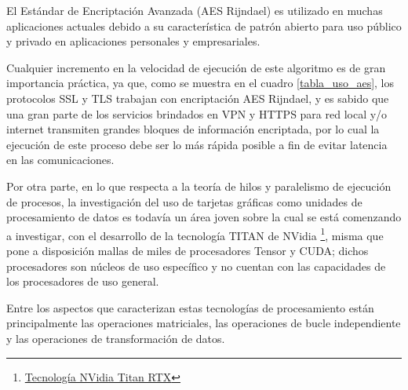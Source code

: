 \documentclass[../main/main.tex]{subfiles}
\begin{document}
  El Estándar de Encriptación Avanzada (AES Rijndael) es utilizado en muchas aplicaciones actuales debido a su característica de patrón abierto para uso público y privado en aplicaciones personales y empresariales.

  Cualquier incremento en la velocidad de ejecución de este algoritmo es de gran importancia práctica, ya que, como se muestra en el cuadro \ref{tabla_uso_aes}, los protocolos SSL y TLS trabajan con encriptación AES Rijndael, y es sabido que una gran parte de los servicios brindados en VPN y HTTPS para red local y/o internet transmiten grandes bloques de información encriptada, por lo cual la ejecución de este proceso debe ser lo más rápida posible a fin de evitar latencia en las comunicaciones.

  Por otra parte, en lo que respecta a la teoría de hilos y paralelismo de ejecución de procesos, la investigación del uso de tarjetas gráficas como unidades de procesamiento de datos es todavía un área joven sobre la cual se está comenzando a investigar, con el desarrollo de la tecnología TITAN de NVidia \footnote{\href{https://www.nvidia.com/en-us/titan/titan-rtx/}{Tecnología NVidia Titan RTX}}, misma que pone a disposición mallas de miles de procesadores Tensor y CUDA; dichos procesadores son núcleos de uso específico y no cuentan con las capacidades de los procesadores de uso general.

  Entre los aspectos que caracterizan estas tecnologías de procesamiento están principalmente las operaciones matriciales, las operaciones de bucle independiente y las operaciones de transformación de datos.
\end{document}

